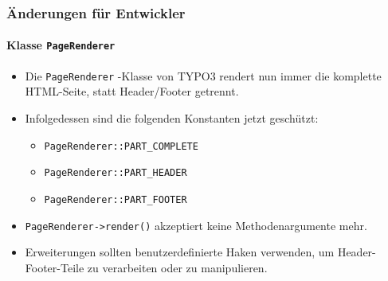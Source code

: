%

\begin{frame}[fragile]
	\frametitle{Änderungen für Entwickler}
	\framesubtitle{Klasse \texttt{PageRenderer}}

	\begin{itemize}
		\item Die \small\texttt{PageRenderer}\normalsize
			-Klasse von TYPO3 rendert nun immer die komplette HTML-Seite,
			statt Header/Footer getrennt.

		\item Infolgedessen sind die folgenden Konstanten jetzt geschützt:

			\begin{itemize}\small
				\item \texttt{PageRenderer::PART\_COMPLETE}
				\item \texttt{PageRenderer::PART\_HEADER}
				\item \texttt{PageRenderer::PART\_FOOTER}
			\end{itemize}

		\item \texttt{PageRenderer->render()} akzeptiert keine Methodenargumente
			mehr.

		\item Erweiterungen sollten benutzerdefinierte Haken verwenden, um Header-
			Footer-Teile zu verarbeiten oder zu manipulieren.

	\end{itemize}
\end{frame}

